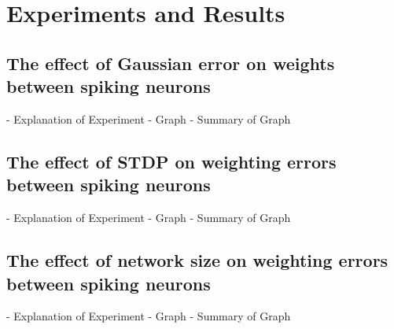 \chapter{Experiments and Results}

\section{The effect of Gaussian error on weights between spiking neurons}
- Explanation of Experiment
- Graph
- Summary of Graph
\section{The effect of STDP on weighting errors between spiking neurons}
- Explanation of Experiment
- Graph
- Summary of Graph
\section{The effect of network size on weighting errors between spiking neurons}
- Explanation of Experiment
- Graph
- Summary of Graph
